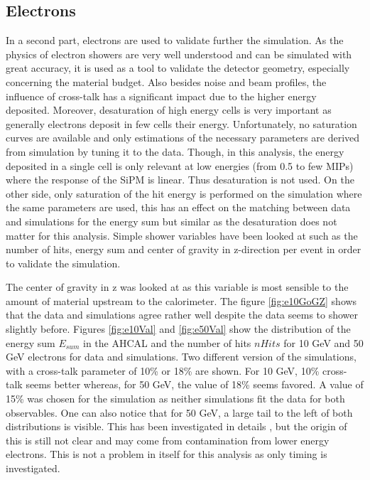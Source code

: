 \subsection{Electrons}

In a second part, electrons are used to validate further the simulation. As the physics of electron showers are very well understood and can be simulated with great accuracy, it is used as a tool to validate the detector geometry, especially concerning the material budget. Also besides noise and beam profiles, the influence of cross-talk has a significant impact due to the higher energy deposited. Moreover, desaturation of high energy cells is very important as generally electrons deposit in few cells their energy. Unfortunately, no saturation curves are available and only estimations of the necessary parameters are derived from simulation by tuning it to the data. Though, in this analysis, the energy deposited in a single cell is only relevant at low energies (from 0.5 to few MIPs) where the response of the SiPM is linear. Thus desaturation is not used. On the other side, only saturation of the hit energy is performed on the simulation where the same parameters are used, this has an effect on the matching between data and simulations for the energy sum but similar as the desaturation does not matter for this analysis. Simple shower variables have been looked at such as the number of hits, energy sum and center of gravity in z-direction per event in order to validate the simulation.

The center of gravity in z was looked at as this variable is most sensible to the amount of material upstream to the calorimeter. The figure \ref{fig:e10GoGZ} shows that the data and simulations agree rather well despite the data seems to shower slightly before. Figures \ref{fig:e10Val} and \ref{fig:e50Val} show the distribution of the energy sum $E_{sum}$ in the AHCAL and the number of hits $nHits$ for 10 GeV and 50 GeV electrons for data and simulations. Two different version of the simulations, with a cross-talk parameter of 10\% or 18\% are shown. For 10 GeV, 10\% cross-talk seems better whereas, for 50 GeV, the value of 18\% seems favored. A value of 15\% was chosen for the simulation as neither simulations fit the data for both observables. One can also notice that for 50 GeV, a large tail to the left of both distributions is visible. This has been investigated in details \cite{AmbraEnergy}, but the origin of this is still not clear and may come from contamination from lower energy electrons. This is not a problem in itself for this analysis as only timing is investigated.

